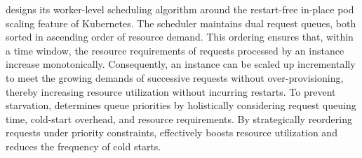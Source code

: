 \sysname designs its worker-level scheduling algorithm around the restart-free in-place pod scaling feature of Kubernetes. The scheduler maintains dual request queues, both sorted in ascending order of resource demand. This ordering ensures that, within a time window, the resource requirements of requests processed by an instance increase monotonically. Consequently, an instance can be scaled up incrementally to meet the growing demands of successive requests without over-provisioning, thereby increasing resource utilization without incurring restarts. To prevent starvation, \sysname determines queue priorities by holistically considering request queuing time, cold-start overhead, and resource requirements. By strategically reordering requests under priority constraints, \sysname effectively boosts resource utilization and reduces the frequency of cold starts.